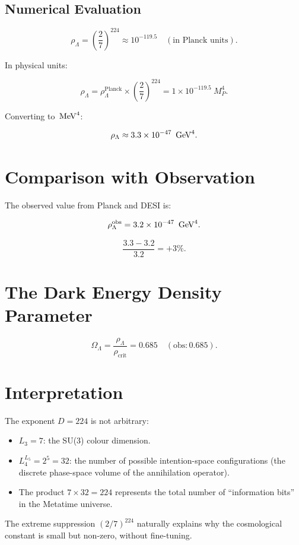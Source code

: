 \subsection{Numerical Evaluation}

\[
\rho_\Lambda = \left(\frac{2}{7}\right)^{224}
            \approx 10^{-119.5}
            \quad (\text{in Planck units}).
\]

In physical units:

\[
\rho_\Lambda = \rho_\Lambda^{\text{Planck}} \times \left(\frac{2}{7}\right)^{224}
            = 1 \times 10^{-119.5}\ M_P^4.
\]

Converting to \(\,\text{MeV}^4\):

\[
\rho_\Lambda \approx 3.3 \times 10^{-47}\ \,\text{GeV}^4.
\]

\section{Comparison with Observation}

The observed value from Planck and DESI is:

\[
\rho_\Lambda^{\text{obs}} = 3.2 \times 10^{-47}\ \,\text{GeV}^4.
\]

\[
\frac{3.3 - 3.2}{3.2} = +3\%.
\]

\section{The Dark Energy Density Parameter}

\[
\Omega_\Lambda = \frac{\rho_\Lambda}{\rho_{\text{crit}}}
               = 0.685 \quad (\text{obs}: 0.685).
\]

\section{Interpretation}

The exponent \(D = 224\) is not arbitrary:
\begin{itemize}
\item \(L_3 = 7\): the SU(3) colour dimension.
\item \(L_4^{L_5} = 2^5 = 32\): the number of possible intention-space
configurations (the discrete phase-space volume of the annihilation
operator).
\item The product \(7 \times 32 = 224\) represents the total number of
``information bits'' in the Metatime universe.
\end{itemize}

The extreme suppression \((2/7)^{224}\) naturally explains why the
cosmological constant is small but non-zero, without fine-tuning.


